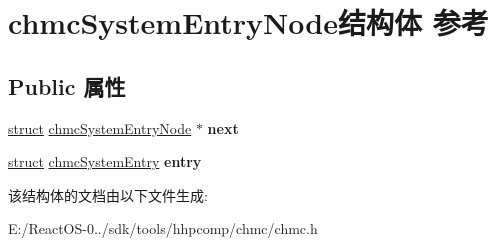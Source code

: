 \hypertarget{structchmc_system_entry_node}{}\section{chmc\+System\+Entry\+Node结构体 参考}
\label{structchmc_system_entry_node}
\subsection*{Public 属性}
\begin{DoxyCompactItemize}
\item 
\mbox{\label{structchmc_system_entry_node_af6f5c955efa9f2c7306a5a7c7bbdde68}} 
\hyperlink{interfacestruct}{struct} \hyperlink{structchmc_system_entry_node}{chmc\+System\+Entry\+Node} $\ast$ {\bfseries next}
\item 
\mbox{\label{structchmc_system_entry_node_a3517dd7cf2c1c59705b6749d2c535c99}} 
\hyperlink{interfacestruct}{struct} \hyperlink{structchmc_system_entry}{chmc\+System\+Entry} {\bfseries entry}
\end{DoxyCompactItemize}


该结构体的文档由以下文件生成\+:\begin{DoxyCompactItemize}
\item 
E\+:/\+React\+O\+S-\/0../sdk/tools/hhpcomp/chmc/chmc.\+h\end{DoxyCompactItemize}

